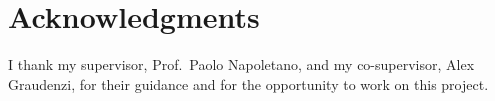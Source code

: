 \chapter*{Acknowledgments}

I thank my supervisor, Prof.\ Paolo Napoletano, and my co-supervisor, Alex Graudenzi, for their guidance and for the opportunity to work on this project.

\ifwithqrcode
  \begin{center}
  \vspace{1cm}
  \end{center}
\fi

\thispagestyle{empty}
\mbox{}
\newpage
